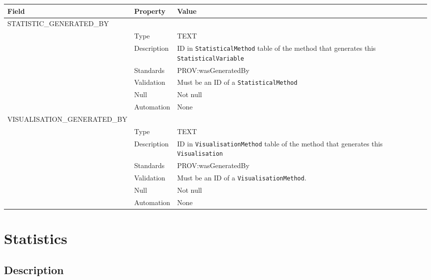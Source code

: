 \documentclass[
]{article}
\newcounter{none} %
\begin{document}
{\def\LTcaptype{none} %
\begin{longtable}[]{@{}
  >{\raggedright\arraybackslash}p{}
  >{\raggedright\arraybackslash}p{}
  >{\raggedright\arraybackslash}p{}@{}}
\toprule\noalign{}
\begin{minipage}[b]{\linewidth}\raggedright
Field
\end{minipage} & \begin{minipage}[b]{\linewidth}\raggedright
Property
\end{minipage} & \begin{minipage}[b]{\linewidth}\raggedright
Value
\end{minipage} \\
\midrule\noalign{}
\endhead
\bottomrule\noalign{}
\endlastfoot
STATISTIC\_GENERATED\_BY & & \\
& Type & TEXT \\
& Description & ID in \texttt{StatisticalMethod} table of the method
that generates this \texttt{StatisticalVariable} \\
& Standards & PROV:wasGeneratedBy \\
& Validation & Must be an ID of a \texttt{StatisticalMethod} \\
& Null & Not null \\
& Automation & None \\
VISUALISATION\_GENERATED\_BY & & \\
& Type & TEXT \\
& Description & ID in \texttt{VisualisationMethod} table of the method
that generates this \texttt{Visualisation} \\
& Standards & PROV:wasGeneratedBy \\
& Validation & Must be an ID of a \texttt{VisualisationMethod}. \\
& Null & Not null \\
& Automation & None \\
\end{longtable}
}

\section{Statistics}\label{statistics}

\subsection{Description}\label{description-31}
\end{document}
